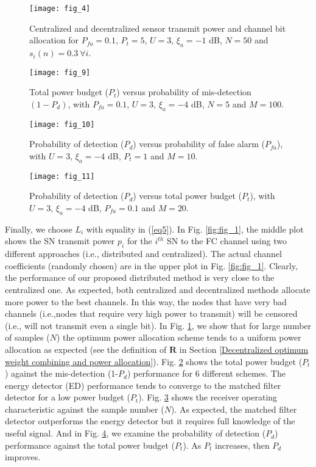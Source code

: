 \documentclass[conference]{IEEEtran}
\begin{document}
\begin{figure}[htp!]
\centerline{\texttt{[image: fig\_4]}}
\caption[Disagreement error versus time for $M=10$ sensors.]{\label{fig:fig_4}
    Centralized and decentralized sensor transmit power and channel bit allocation for $P_{fa}=0.1$, $P_t=5$, $U=3$, $\xi_a=-1$ dB, $N=50$ and $s_i(n)=0.3 \ \forall i$.}
\end{figure}
\begin{figure}[htp!]
\centerline{\texttt{[image: fig\_9]}}
\caption[Disagreement error versus time for $M=10$ sensors.]{\label{fig:fig_9}
    Total power budget ($P_t$) versus probability of mis-detection $(1-P_d)$, with $P_{fa}=0.1$, $U=3$, $\xi_a=-4$ dB, $N=5$ and $M=100$.}
\end{figure}
\begin{figure}[htp!]
\centerline{\texttt{[image: fig\_10]}}
\caption[Disagreement error versus time for $M=10$ sensors.]{\label{fig:fig_10}
Probability of detection ($P_d$) versus probability of false alarm ($P_{fa}$), with $U=3$, $\xi_a=-4$ dB, $P_t=1$ and $M=10$.}
\end{figure}
\begin{figure}[htp!]
\centerline{\texttt{[image: fig\_11]}}
\caption[Disagreement error versus time for $M=10$ sensors.]{\label{fig:fig_11}
 Probability of detection ($P_d$) versus total power budget ($P_{t}$), with $U=3$, $\xi_a=-4$ dB, $P_{fa}=0.1$ and $M=20$.}
\end{figure}
Finally, we choose $L_i$ with equality in (\ref{eq5}). In Fig. \ref{fig:fig_1}, the middle plot shows  the SN transmit power $p_i$  for the $i^{th}$ SN to the FC channel using two different approaches (i.e., distributed and centralized). The actual channel coefficients (randomly chosen) are in the upper plot in Fig. \ref{fig:fig_1}. Clearly, the performance of our proposed distributed method is very close to the centralized one. As expected, both centralized and decentralized methods  allocate more power to the best channels. In this way, the nodes that have very bad channels (i.e.,nodes that require very high power to transmit) will be censored (i.e., will not transmit even a single bit). 
In Fig. \ref{fig:fig_4}, we show that for large number of samples ($N$) the optimum power allocation scheme tends to a uniform power allocation as expected (see the definition of $\boldsymbol R$ in Section \ref{Decentralized optimum weight combining and power allocation}). Fig. \ref{fig:fig_9} shows the total power budget ($P_t$) against the mis-detection (1-$P_d$) performance for 6 different schemes. The energy detector (ED) performance tends to converge to the matched filter detector for a low power budget ($P_t$). Fig. \ref{fig:fig_10} shows the receiver operating characteristic against the sample number ($N$). As expected, the matched filter detector outperforms the energy detector but it requires full knowledge of the useful signal. And in Fig. \ref{fig:fig_11}, we examine the probability of detection ($P_d$)  performance against the total power budget ($P_t$). As $P_t$ increases, then $P_d$ improves. 
\end{document}
